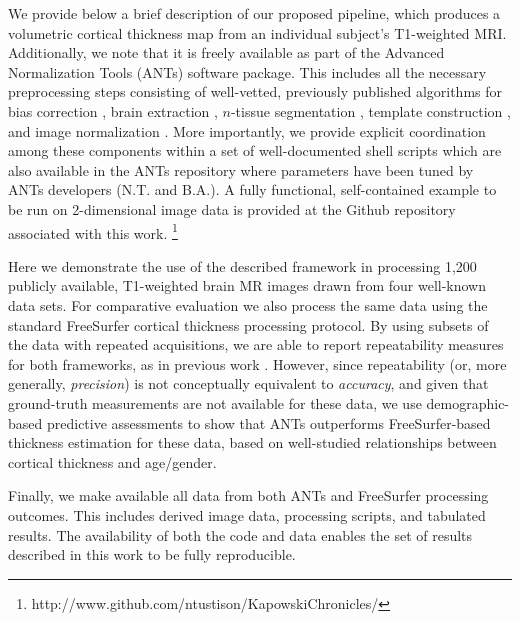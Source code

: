 We provide below a brief description of our proposed pipeline, which produces a volumetric
cortical thickness map from an individual subject's T1-weighted MRI.
Additionally, we note that it is freely available as part of the Advanced Normalization Tools
(ANTs) software package.  This includes all the necessary preprocessing steps consisting
of well-vetted, previously published algorithms for bias correction \citep{tustison2010},
brain extraction \citep{avants2010a}, $n$-tissue segmentation \citep{avants2011a},
template construction \citep{avants2010}, and image normalization \citep{avants2011}.
More importantly, we provide explicit coordination among
these components within a set of well-documented shell scripts which
are also available in the ANTs repository where parameters have been tuned
by ANTs developers (N.T. and B.A.).  A fully functional, self-contained example
 to be run on 2-dimensional image data is provided
at the Github repository associated with this work.%
\footnote{
http://www.github.com/ntustison/KapowskiChronicles/
}

Here we demonstrate the use of the described framework
in processing 1,200 publicly available, T1-weighted brain MR images drawn from
four well-known data sets.
For comparative evaluation we also process the same data using the
standard FreeSurfer cortical thickness processing protocol.  By using
subsets of the data with repeated acquisitions, we are able to report repeatability measures
for both frameworks, as in previous work
\citep{clarkson2011,jovicich2013}.  However, since repeatability (or, more generally, {\it precision})
is not conceptually equivalent to {\it accuracy}, and given that ground-truth
measurements are not available for these data, we use demographic-based
predictive assessments to show that ANTs outperforms FreeSurfer-based
thickness estimation for these data, based on well-studied relationships between
cortical thickness and age/gender.

Finally, we make available all data from both ANTs and FreeSurfer 
processing outcomes.  This includes derived image data, processing scripts, 
and tabulated results.  The availability of both the code and data enables
the set of results described in this work to be fully reproducible.  




